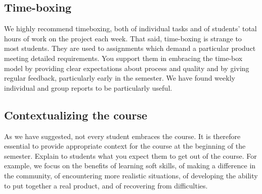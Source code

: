 \subsection{Time-boxing}

We highly recommend timeboxing, both of individual tasks and of students' 
total hours of work on the project each week.
That said, 
time-boxing is strange to most students.  They are used to assignments 
which demand a particular
product meeting detailed requirements.  You support them in embracing the
time-box model by providing clear expectations about process and quality and
by giving regular feedback, particularly early in the semester.  We have
found weekly individual and group reports to be particularly useful.

\subsection{Contextualizing the course}

As we have suggested, not every student embraces the course.  It
is therefore essential to provide appropriate context for the course at
the beginning of the semester.  Explain to students what you expect them
to get out of the course.  For example, we focus on the benefits of learning
soft skills, of making a difference in the community, of encountering
more realistic situations, of developing the ability to put together a
real product, and of recovering from difficulties.
